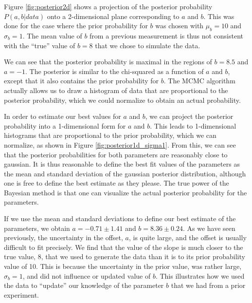 Figure \ref{fig:posterior2d} shows a projection of the posterior probability $P(a,b|data)$ onto a 2-dimensional plane corresponding to $a$ and $b$. This was done for the case where the prior probability for $b$ was chosen with $\mu_b=10$ and $\sigma_b=1$. The mean value of $b$ from a previous measurement is thus not consistent with the ``true'' value of $b=8$ that we chose to simulate the data. 

We can see that the posterior probability is maximal in the regions of $b=8.5$ and $a=-1$. The posterior is similar to the chi-squared as a function of $a$ and $b$, except that it also contains the prior probability for $b$. The MCMC algorithm actually allows us to draw a histogram of data that are proportional to the posterior probability, which we could normalize to obtain an actual probability.


In order to estimate our best values for $a$ and $b$, we can project the posterior probability into a 1-dimensional form for $a$ and $b$. This leads to 1-dimensional histograms that are proportional to the prior probability, which we can normalize, as shown in Figure \ref{fig:posterior1d_sigma1}. From this, we can see that the posterior probabilities for both parameters are reasonably close to gaussian. It is thus reasonable to define the best fit values of the parameters as the mean and standard deviation of the gaussian posterior distribution, although one is free to define the best estimate as they please. The true power of the Bayesian method is that one can visualize the actual posterior probability for the parameters. 

If we use the mean and standard deviations to define our best estimate of the parameters, we obtain $a=-0.71\pm1.41$ and $b=8.36 \pm  0.24$. As we have seen previously, the uncertainty in the offset, $a$, is quite large, and the offset is usually difficult to fit precisely. We find that the value of the slope is much closer to the true value, 8, that we used to generate the data than it is to its prior probability value of 10. This is because the uncertainty in the prior value, was rather large, $\sigma_b=1$, and did not influence or updated value of $b$. This illustrates how we used the data to ``update'' our knowledge of the parameter $b$ that we had from a prior experiment.


